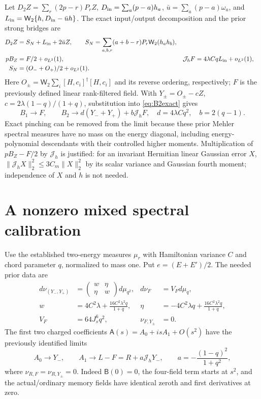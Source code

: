 \documentclass[11pt,a4paper]{article}
\newcommand{\MA}{\mathsf A}
\newcommand{\BB}{\mathsf B}
\newcommand{\Jh}{\mathcal J_h}
\newcommand{\W}{\mathsf W}
\begin{document}
Let $D_2Z=\sum_r(2p-r)P_rZ$, $D_{\rm in}=\sum_a(p-a)h_a$,
$\bar u=\sum_a(p-a)\omega_a$, and
$L_{\rm in}=\W_2\{h,D_{\rm in}-\bar u h\}$.
The exact input/output decomposition and the prior strong bridges are
\begin{align}
 D_2Z&=S_N+L_{\rm in}+2\bar uZ,\qquad
 S_N=\sum_{a,b,r}(a+b-r)P_r\W_2(h_ah_b),\\
 pB_Z&=F/2+o_{L^2}(1),&
 \Jh F&=4\lambda CqL_{\rm in}+o_{L^2}(1),\\
 S_N&=(O_-+O_+)/2+o_{L^2}(1).
\end{align}
Here $O_\pm=\W_2\sum_i[H,c_i]^\dagger[H,c_i]$ and its reverse
ordering, respectively; $F$ is the previously defined linear
rank-filtered field. With $Y_\pm=O_\pm-cZ$,
$c=2\lambda(1-q)/(1+q)$, substitution into \eqref{eq:B2exact} gives
\begin{equation}
 \boxed{\quad B_1\to F,\qquad
 B_2\to d(Y_-+Y_+)+b\Jh F,
 \quad d=4\lambda Cq^2,\quad b=2(q-1).\quad}
 \label{eq:Blimit}
\end{equation}
Exact pinching can be removed from the limit because these prior
Mehler spectral measures have no mass on the energy diagonal,
including energy-polynomial descendants with their controlled
higher moments. Multiplication of $pB_Z-F/2$ by $\Jh$ is justified:
for an invariant Hermitian linear Gaussian error $X$,
$\|\Jh X\|_2^2\le3C_m\|X\|_2^2$ by its scalar variance and
Gaussian fourth moment; independence of $X$ and $h$ is not needed.

\newpage
\section{A nonzero mixed spectral calibration}
Use the established two-energy measures $\mu_r$ with Hamiltonian
variance $C$ and chord parameter $q$, normalized to mass one.
Put $e=(E+E')/2$. The needed prior data \cite{Central,Mixed} are
\begin{align}
 d\nu_{(Y_-,Y_+)}&=
 \begin{pmatrix}w&\eta\\\eta&w\end{pmatrix}d\mu_{q^2},
 &d\nu_F&=V_Fd\mu_q,\\
 w&=4C^2\lambda+\frac{16C^2\lambda^2q}{1+q},
 &\eta&=-4C^2\lambda q+\frac{16C^2\lambda^2q}{1+q},\\
 V_F&=64J_s^6q^2,&\nu_{F,Y_\pm}&=0.
\end{align}
The first two charged coefficients $\MA(s)=A_0+isA_1+O(s^2)$
have the previously identified limits
\begin{equation}
 A_0\to Y_-,\qquad A_1\to L-F=R+a\Jh Y_-,\qquad
 a=-\frac{(1-q)^2}{1+q^2},
\end{equation}
where $\nu_{R,F}=\nu_{R,Y_\pm}=0$. Indeed $\BB(0)=0$, the
four-field term starts at $s^2$, and the actual/ordinary memory
fields have identical zeroth and first derivatives at zero.
\end{document}
